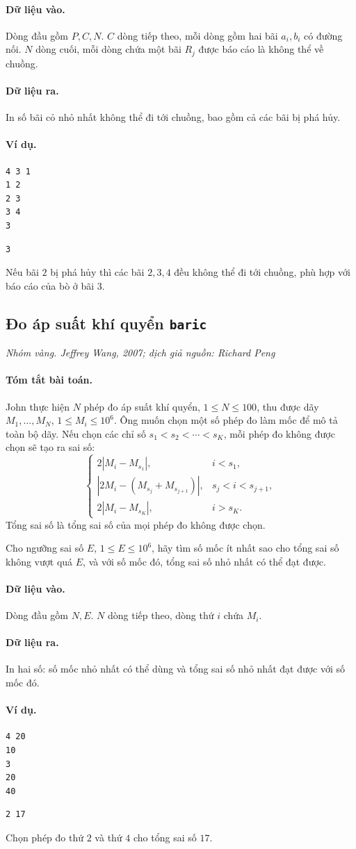 \documentclass[11pt]{article}
\newcommand{\problem}[4]{%
  \subsection[#1 (#2)]{#1 \hfill {\normalsize\texttt{#2}}}%
  \noindent\textit{#3. #4}\par\smallskip
}
\newcommand{\iosec}[1]{\paragraph{#1}}
\begin{document}
\iosec{Dữ liệu vào.}
Dòng đầu gồm \(P,C,N\). \(C\) dòng tiếp theo, mỗi dòng gồm hai bãi \(a_i,b_i\)
có đường nối. \(N\) dòng cuối, mỗi dòng chứa một bãi \(R_j\) được báo cáo là
không thể về chuồng.

\iosec{Dữ liệu ra.}
In số bãi cỏ nhỏ nhất không thể đi tới chuồng, bao gồm cả các bãi bị phá hủy.

\iosec{Ví dụ.}
\begin{verbatim}
4 3 1
1 2
2 3
3 4
3
\end{verbatim}

\begin{verbatim}
3
\end{verbatim}

Nếu bãi \(2\) bị phá hủy thì các bãi \(2,3,4\) đều không thể đi tới chuồng,
phù hợp với báo cáo của bò ở bãi \(3\).

\problem{Đo áp suất khí quyển}{baric}{Nhóm vàng}{Jeffrey Wang, 2007; dịch giả nguồn: Richard Peng}

\iosec{Tóm tắt bài toán.}
John thực hiện \(N\) phép đo áp suất khí quyển, \(1\le N\le 100\), thu được
dãy \(M_1,\ldots,M_N\), \(1\le M_i\le 10^6\). Ông muốn chọn một số phép đo
làm mốc để mô tả toàn bộ dãy. Nếu chọn các chỉ số
\(s_1<s_2<\cdots<s_K\), mỗi phép đo không được chọn sẽ tạo ra sai số:
\[
\begin{cases}
2|M_i-M_{s_1}|, & i<s_1,\\
|2M_i-(M_{s_j}+M_{s_{j+1}})|, & s_j<i<s_{j+1},\\
2|M_i-M_{s_K}|, & i>s_K.
\end{cases}
\]
Tổng sai số là tổng sai số của mọi phép đo không được chọn.

Cho ngưỡng sai số \(E\), \(1\le E\le 10^6\), hãy tìm số mốc ít nhất sao cho
tổng sai số không vượt quá \(E\), và với số mốc đó, tổng sai số nhỏ nhất có
thể đạt được.

\iosec{Dữ liệu vào.}
Dòng đầu gồm \(N,E\). \(N\) dòng tiếp theo, dòng thứ \(i\) chứa \(M_i\).

\iosec{Dữ liệu ra.}
In hai số: số mốc nhỏ nhất có thể dùng và tổng sai số nhỏ nhất đạt được với
số mốc đó.

\iosec{Ví dụ.}
\begin{verbatim}
4 20
10
3
20
40
\end{verbatim}

\begin{verbatim}
2 17
\end{verbatim}

Chọn phép đo thứ \(2\) và thứ \(4\) cho tổng sai số \(17\).
\end{document}
